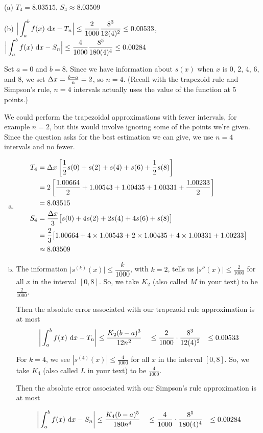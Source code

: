 \begin{answer}
(a)  $T_4=8.03515$, $S_4\approx 8.03509$

\noindent
(b) $\displaystyle\Big|\int_a^b f(x)\ \dee{x} -T_n\Big|
                \le \frac{2}{1000}\frac{8^3}{12(4)^2} \le0.00533$,\quad
$\displaystyle\Big|\int_a^b f(x)\ \mathrm{d}x -S_n\Big|
                 \le   \frac{4}{1000}\frac{8^5}{180(4)^4}\le0.00284$

\end{answer}

\begin{solution}
Set $a=0$ and $b=8$. Since we have information about $s(x)$ when $x$ is 0, 2, 4, 6, and 8, we set  $\Delta x=\frac{b-a}{n}=2$, so $n=4$. (Recall with the trapezoid rule and Simpson's rule, $n=4$ intervals actually uses the value of the function at 5 points.)

We could perform the trapezoidal approximations with fewer intervals, for example $n=2$, but this would involve ignoring some of the points we're given. Since the question asks for the best estimation we can give, we use $n=4$ intervals and no fewer.
\begin{enumerate}[(a)]
\item

\begin{align*}
T_4&={\Delta x}\left[\frac{1}{2}s(0)+s(2)+s(4)+s(6)+\frac{1}{2}s(8)\right]\\
&=2\left[\frac{1.00664}{2}+1.00543+ 1.00435+1.00331+ \frac{1.00233}{2}\right]\\
&=8.03515
\\
S_4&=\frac{\Delta x}{3}\big[s(0)+4s(2)+2s(4)+4s(6)+s(8)\big]\\
&=\frac{2}{3}\big[1.00664+4\times 1.00543+2\times 1.00435+4\times1.00331+ 1.00233\big]\\
&\approx 8.03509
\end{align*}

\item
The information $\big|s^{(k)}(x)\big|\le \dfrac{k}{1000}$, with $k=2$, tells us $|s''(x)|\leq \frac{2}{1000}$ for all $x$ in the interval $[0,8]$. So, we take $K_2$ (also called $M$ in your text) to be $\frac{2}{1000}$.

Then the absolute error associated with our trapezoid rule approximation is at most
\begin{alignat*}{3}
\bigg|\int_a^b f(x)\ \mathrm{d}x -T_n\bigg|&\le \frac{K_2(b-a)^3}{12n^2}
&&\le \frac{2}{1000}\cdot\frac{8^3}{12(4)^2}
&\le 0.00533
\end{alignat*}

For $k=4$, we see $|s^{(4)}(x)|\leq \frac{4}{1000}$ for all $x$ in the interval $[0,8]$. So, we take $K_4$ (also called $L$ in your text) to be $\frac{4}{1000}$.

Then the absolute error associated with our Simpson's rule approximation is at most

\begin{alignat*}{3}
\bigg|\int_a^b f(x)\ \mathrm{d}x -S_n\bigg|&\le \frac{K_4(b-a)^5}{180n^4}
&&\le \frac{4}{1000}\cdot\frac{8^5}{180(4)^4}
&\le0.00284
\end{alignat*}
\end{enumerate}
\end{solution}
